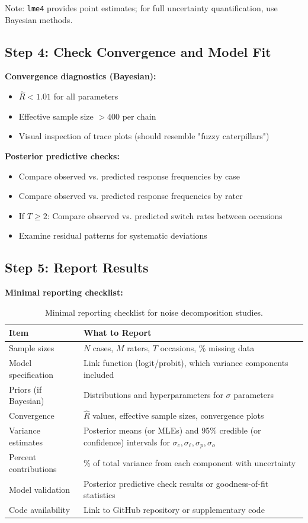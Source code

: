 Note: \texttt{lme4} provides point estimates; for full uncertainty quantification, use Bayesian methods.

\subsection*{Step 4: Check Convergence and Model Fit}

\textbf{Convergence diagnostics (Bayesian):}
\begin{itemize}
    \item $\hat{R} < 1.01$ for all parameters
    \item Effective sample size $> 400$ per chain
    \item Visual inspection of trace plots (should resemble "fuzzy caterpillars")
\end{itemize}

\textbf{Posterior predictive checks:}
\begin{itemize}
    \item Compare observed vs. predicted response frequencies by case
    \item Compare observed vs. predicted response frequencies by rater
    \item If $T \geq 2$: Compare observed vs. predicted switch rates between occasions
    \item Examine residual patterns for systematic deviations
\end{itemize}

\subsection*{Step 5: Report Results}

\textbf{Minimal reporting checklist:}
\begin{table}[h!]
\centering
\small
\begin{tabular}{p{}p{}}
\toprule
\textbf{Item} & \textbf{What to Report} \\
\midrule
Sample sizes & $N$ cases, $M$ raters, $T$ occasions, \% missing data \\
Model specification & Link function (logit/probit), which variance components included \\
Priors (if Bayesian) & Distributions and hyperparameters for $\sigma$ parameters \\
Convergence & $\hat{R}$ values, effective sample sizes, convergence plots \\
Variance estimates & Posterior means (or MLEs) and 95\% credible (or confidence) intervals for $\sigma_c, \sigma_\ell, \sigma_p, \sigma_o$ \\
Percent contributions & \% of total variance from each component with uncertainty \\
Model validation & Posterior predictive check results or goodness-of-fit statistics \\
Code availability & Link to GitHub repository or supplementary code \\
\bottomrule
\end{tabular}
\caption{Minimal reporting checklist for noise decomposition studies.}
\label{tab:reporting}
\end{table}

